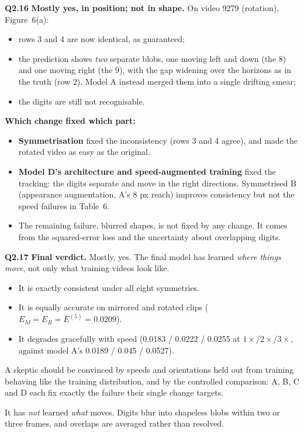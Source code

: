 \documentclass[11pt]{article}
\newcommand{\q}[1]{\par\medskip\noindent\textbf{#1}\quad}
\begin{document}
\q{Q2.16}
\textbf{Mostly yes, in position; not in shape.} On video 9279 (rotation), Figure~6(a):
\begin{itemize}
  \item rows 3 and 4 are now identical, as guaranteed;
  \item the prediction shows \emph{two} separate blobs, one moving left and down (the 8) and one moving right (the 9), with the gap widening over the horizons as in the truth (row 2). Model A instead merged them into a single drifting smear;
  \item the digits are still not recognisable.
\end{itemize}
\textbf{Which change fixed which part:}
\begin{itemize}
  \item \textbf{Symmetrisation} fixed the inconsistency (rows 3 and 4 agree), and made the rotated video as easy as the original.
  \item \textbf{Model D's architecture and speed-augmented training} fixed the tracking: the digits separate and move in the right directions. Symmetrised B (appearance augmentation, A's 8 px reach) improves consistency but not the speed failures in Table~6.
  \item The remaining failure, blurred shapes, is not fixed by any change. It comes from the squared-error loss and the uncertainty about overlapping digits.
\end{itemize}

\q{Q2.17}
\textbf{Final verdict.} Mostly, yes. The final model has learned \emph{where things move}, not only what training videos look like.
\begin{itemize}
  \item It is exactly consistent under all eight symmetries.
  \item It is equally accurate on mirrored and rotated clips ($E_M=E_R=E^{(5)}=0.0209$).
  \item It degrades gracefully with speed (0.0183 / 0.0222 / 0.0255 at $1\times$/$2\times$/$3\times$, against model A's 0.0189 / 0.045 / 0.0527).
\end{itemize}
A skeptic should be convinced by speeds and orientations held out from training behaving like the training distribution, and by the controlled comparison: A, B, C and D each fix exactly the failure their single change targets.

It has \emph{not} learned \emph{what} moves. Digits blur into shapeless blobs within two or three frames, and overlaps are averaged rather than resolved.
\end{document}
